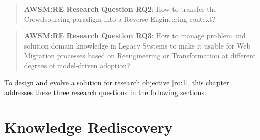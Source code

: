 \begin{quote}
\textbf{AWSM:RE Research Question RQ2}: How to transfer the \gls{Crowdsourcing} paradigm into a \gls{Reverse Engineering} context?
\end{quote}

\begin{quote}
\textbf{AWSM:RE Research Question RQ3}: How to manage problem and solution domain knowledge in \glspl{Legacy System} to make it usable for \gls{Web Migration} processes based on \gls{Reengineering} or \gls{Transformation} at different degrees of model-driven adoption?
\end{quote}

To design and evolve a solution for research objective \cref{ro:1}, this chapter addresses these three research questions in the following sections.
%
%
%
%
%

\vspace{-20pt}
\hypertarget{sec:re.conceptual.process}{%
\section{Knowledge Rediscovery}\label{sec:re.conceptual.process}}
\vspace{5pt}

